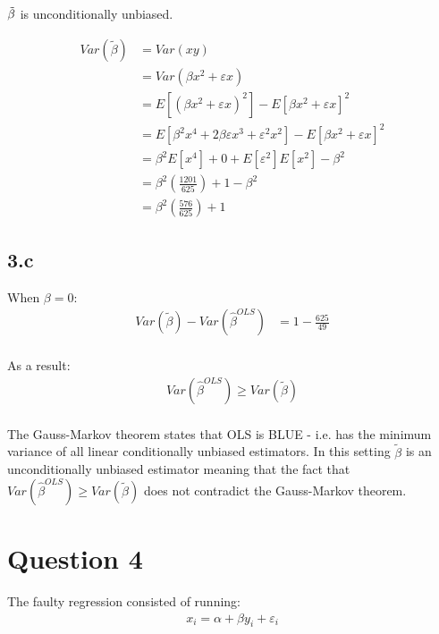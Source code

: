 \documentclass{article}
\begin{document}
$\Tilde{\beta}$ is unconditionally unbiased.

\begin{align*}
    Var(\tilde{\beta})
    &= Var\left(xy\right)\\
    &= Var(\beta x^2 + \varepsilon x)\\
    &= E[(\beta x^2 + \varepsilon x)^2] - E[\beta x^2 + \varepsilon x]^2\\
    &= E[\beta^2 x^4 + 2\beta \varepsilon x^3 + \varepsilon^2 x^2]  - E[\beta x^2 + \varepsilon x]^2  \\
    &= \beta^2 E[x^4] + 0 + E[\varepsilon^2]E[x^2] - \beta^2\\
    &= \beta^2 \left(\frac{1201}{625}\right) + 1 - \beta^2\\
    &= \beta^2 \left(\frac{576}{625}\right) + 1
\end{align*}

\subsection*{3.c}

When $\beta = 0$:
\begin{align*}
    Var(\tilde{\beta}) - Var(\hat{\beta}^{OLS})
    &= 1 - \frac{625}{49}\\
\end{align*}

As a result:
\begin{align*}
    Var(\hat{\beta}^{OLS}) \ge Var(\tilde{\beta}) \\
\end{align*}

The Gauss-Markov theorem states that OLS is BLUE - i.e. has the minimum variance of all linear conditionally unbiased estimators. In this setting $\tilde{\beta}$ is an unconditionally unbiased estimator meaning that the fact that $Var(\hat{\beta}^{OLS}) \ge Var(\tilde{\beta})$ does not contradict the Gauss-Markov theorem.


\clearpage
\section*{Question 4}

The faulty regression consisted of running:
\begin{align*}
    x_{i} = \alpha + \beta y_{i} + \varepsilon_{i} \\
\end{align*}
\end{document}

